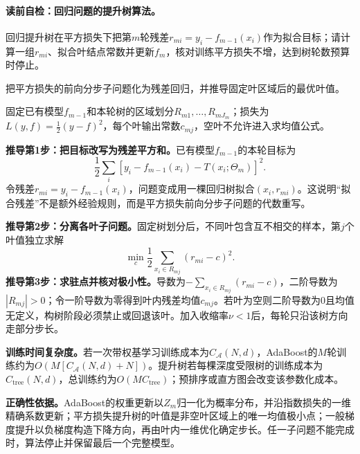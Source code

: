 \paragraph{读前自检：回归问题的提升树算法。}回归提升树在平方损失下把第$m$轮残差$r_{mi}=y_i-f_{m-1}(x_i)$作为拟合目标；请计算一组$r_{mi}$、拟合叶结点常数并更新$f_m$，核对训练平方损失不增，达到树轮数预算时停止。\par

\label{struct:V3-C03-CH21}

\begin{derivationgoalbox}
把平方损失的前向分步子问题化为残差回归，并推导固定叶区域后的最优叶值。
\end{derivationgoalbox}
\begin{derivationprepbox}
固定已有模型$f_{m-1}$和本轮树的区域划分$R_{m1},\ldots,R_{mJ_m}$；损失为$L(y,f)=\tfrac12(y-f)^2$，每个叶输出常数$c_{mj}$，空叶不允许进入求均值公式。
\end{derivationprepbox}
\textbf{推导第1步：把目标改写为残差平方和。}已有模型$f_{m-1}$的本轮目标为
\[
\frac12\sum_i[y_i-f_{m-1}(x_i)-T(x_i;\Theta_m)]^2.
\]
令残差$r_{mi}=y_i-f_{m-1}(x_i)$，问题变成用一棵回归树拟合$(x_i,r_{mi})$。这说明“拟合残差”不是额外经验规则，而是平方损失前向分步子问题的代数重写。

\label{struct:V3-C03-CH22}
\textbf{推导第2步：分离各叶子问题。}固定树划分后，不同叶包含互不相交的样本，第$j$个叶值独立求解
\[
\min_c\frac12\sum_{x_i\in R_{mj}}(r_{mi}-c)^2.
\]
\textbf{推导第3步：求驻点并核对极小性。}导数为$-\sum_{x_i\in R_{mj}}(r_{mi}-c)$，二阶导数为$|R_{mj}|>0$；令一阶导数为零得到叶内残差均值$c_{mj}$。若叶为空则二阶导数为0且均值无定义，构树阶段必须禁止或回退该叶。加入收缩率$\nu<1$后，每轮只沿该树方向走部分步长。

\label{struct:V3-C03-CH28}
\begin{complexitybox}
\textbf{训练时间复杂度。}若一次带权基学习训练成本为$C_{\mathcal A}(N,d)$，AdaBoost的$M$轮训练约为$O(M[C_{\mathcal A}(N,d)+N])$。提升树若每棵深度受限树的训练成本为$C_{\mathrm{tree}}(N,d)$，总训练约为$O(MC_{\mathrm{tree}})$；预排序或直方图会改变该参数化成本。

\textbf{正确性依据。}AdaBoost的权重更新以$Z_m$归一化为概率分布，并沿指数损失的一维精确系数更新；平方损失提升树的叶值是非空叶区域上的唯一均值极小点；一般梯度提升以负梯度构造下降方向，再由叶内一维优化确定步长。任一子问题不能完成时，算法停止并保留最后一个完整模型。
\end{complexitybox}

